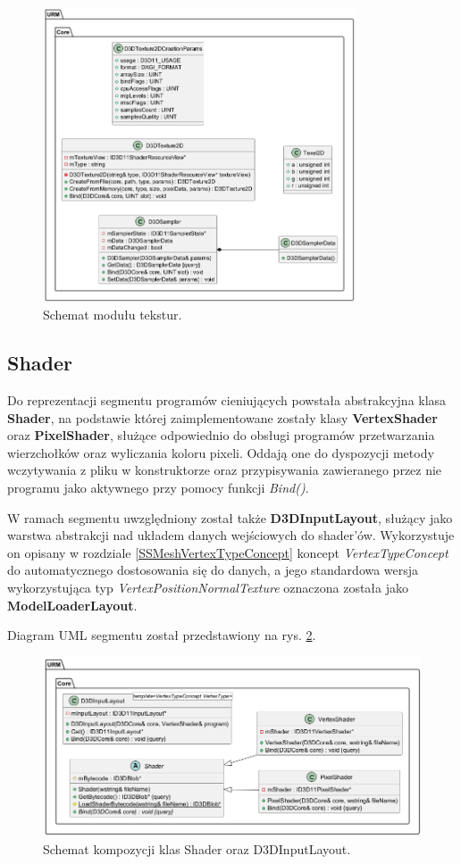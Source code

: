 	\begin{figure}[h!]
		\centering
		\includegraphics[width=350px]{images/UML/texture.png}
		\caption{Schemat modułu tekstur.}
		\label{UML_Textures}
	\end{figure}
	
\subsection{Shader}
	Do reprezentacji segmentu programów cieniujących powstała abstrakcyjna klasa \textbf{Shader}, na podstawie której zaimplementowane zostały klasy \textbf{VertexShader} oraz \textbf{PixelShader}, służące odpowiednio do obsługi programów przetwarzania wierzchołków oraz wyliczania koloru pixeli. Oddają one do dyspozycji metody wczytywania z pliku w konstruktorze oraz przypisywania zawieranego przez nie programu jako aktywnego przy pomocy funkcji \textit{Bind()}.
	
	W ramach segmentu uwzględniony został także \textbf{D3DInputLayout}, służący jako warstwa abstrakcji nad układem danych wejściowych do shader'ów. Wykorzystuje on opisany w rozdziale \ref{SSMeshVertexTypeConcept} koncept \textit{VertexTypeConcept} do automatycznego dostosowania się do danych, a jego standardowa wersja wykorzystująca typ \textit{VertexPositionNormalTexture} oznaczona została jako \textbf{ModelLoaderLayout}.
	
	Diagram UML segmentu został przedstawiony na rys. \ref{UML_ShaderPipeline}.

	\vfill
	\clearpage
	
	\begin{figure}[h!]
		\centering
		\includegraphics[width=\textwidth]{images/UML/shader.png}
		\caption{Schemat kompozycji klas Shader oraz D3DInputLayout.}
		\label{UML_ShaderPipeline}
	\end{figure}
	

